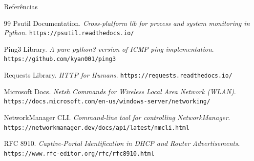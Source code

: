 \documentclass[aspectratio=169]{beamer}
\begin{document}
\begin{frame}[allowframebreaks]{Referências}
\begin{thebibliography}{99}
Psutil Documentation. 
\textit{Cross-platform lib for process and system monitoring in Python}. 
\texttt{https://psutil.readthedocs.io/}

Ping3 Library.
\textit{A pure python3 version of ICMP ping implementation}.
\texttt{https://github.com/kyan001/ping3}

Requests Library.
\textit{HTTP for Humans}.
\texttt{https://requests.readthedocs.io/}

Microsoft Docs.
\textit{Netsh Commands for Wireless Local Area Network (WLAN)}.
\texttt{https://docs.microsoft.com/en-us/windows-server/networking/}

NetworkManager CLI.
\textit{Command-line tool for controlling NetworkManager}.
\texttt{https://networkmanager.dev/docs/api/latest/nmcli.html}

RFC 8910.
\textit{Captive-Portal Identification in DHCP and Router Advertisements}.
\texttt{https://www.rfc-editor.org/rfc/rfc8910.html}
\end{thebibliography}
\end{frame}
\end{document}
